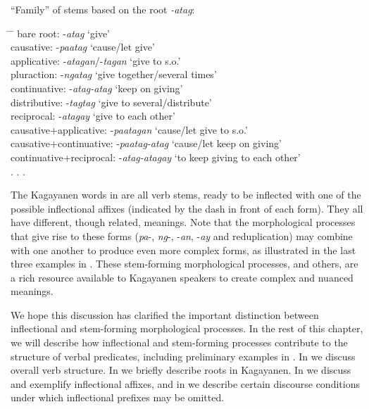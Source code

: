 \ea
\label{bkm:Ref59345903}
“Family” of stems based on the root \textit{{}-atag}: \\
\begin{tabbing}
\hspace{4cm} \= \hspace{2.4cm} \= \kill    
bare root: \>   {}-\textit{atag}      \> ‘give’ \\
causative: \>   {}-\textit{paatag}    \> ‘cause/let give’ \\
applicative: \>   {}-\textit{atagan}/-\textit{tagan} \> ‘give to s.o.’ \\
pluraction:  \>  {}-\textit{ngatag} \>   ‘give together/several times’ \\
continuative:  \>  {}-\textit{atag-atag}   \> ‘keep on giving’ \\
distributive: \>   {}-\textit{tagtag}    \> ‘give to several/distribute’ \\
reciprocal: \>   {}-\textit{atagay}    \> ‘give to each other’ \\
causative+applicative: \> {}-\textit{paatagan}  \>  ‘cause/let give to s.o.’ \\
causative+continuative: \> {}-\textit{paatag-atag} \> ‘cause/let keep on giving’ \\
continuative+reciprocal: \> {}-\textit{atag-atagay} \> ‘to keep giving to each other’ \\
. . .
\end{tabbing}

\z

The Kagayanen words in  are all verb stems, ready to be inflected with one of the possible inflectional affixes (indicated by the dash in front of each form). They all have different, though related, meanings. Note that the morphological processes that give rise to these forms (\textit{pa}-, \textit{ng}-, -\textit{an}, -\textit{ay} and reduplication) may combine with one another to produce even more complex forms, as illustrated in the last three examples in . These  stem-forming morphological processes, and others, are a rich resource available to Kagayanen speakers to create complex and nuanced meanings.

We hope this discussion has clarified the important distinction between  inflectional and  stem-forming morphological processes. In the rest of this chapter, we will describe how  inflectional and  stem-forming processes contribute to the structure of verbal predicates, including preliminary examples in . In  we discuss overall verb structure. In  we briefly describe roots in Kagayanen. In  we discuss and exemplify  inflectional affixes, and in  we describe certain discourse conditions under which  inflectional prefixes may be omitted.
